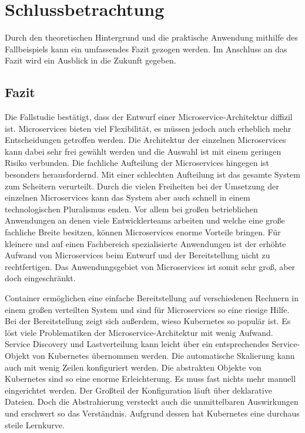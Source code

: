 \section{Schlussbetrachtung}

Durch den theoretischen Hintergrund und die praktische Anwendung mithilfe des Fallbeispiels kann ein umfassendes Fazit gezogen werden. Im Anschluss an das Fazit wird ein Ausblick in die Zukunft gegeben.

\subsection{Fazit}
Die Fallstudie bestätigt, dass der Entwurf einer Microservice-Architektur diffizil ist. Microservices bieten viel Flexibilität, es müssen jedoch auch erheblich mehr Entscheidungen getroffen werden. Die Architektur der einzelnen Microservices kann dabei sehr frei gewählt werden und die Auswahl ist mit einem geringen Risiko verbunden. Die fachliche Aufteilung der Microservices hingegen ist besonders herausfordernd. Mit einer schlechten Aufteilung ist das gesamte System zum Scheitern verurteilt. Durch die vielen Freiheiten bei der Umsetzung der einzelnen Microservices kann das System aber auch schnell in einem technologischen Pluralismus enden. Vor allem bei großen betrieblichen Anwendungen an denen viele Entwicklerteams arbeiten und welche eine große fachliche Breite besitzen, können Microservices enorme Vorteile bringen. Für kleinere und auf einen Fachbereich spezialisierte Anwendungen ist der erhöhte Aufwand von Microservices beim Entwurf und der Bereitstellung nicht zu rechtfertigen. Das Anwendungsgebiet von Microservices ist somit sehr groß, aber doch eingeschränkt.

Container ermöglichen eine einfache Bereitstellung auf verschiedenen Rechnern in einem großen verteilten System und sind für Microservices so eine riesige Hilfe. Bei der Bereitstellung zeigt sich außerdem, wieso Kubernetes so populär ist. Es löst viele Problematiken der Microservice-Architektur mit wenig Aufwand. Service Discovery und Lastverteilung kann leicht über ein entsprechendes Service-Objekt von Kubernetes übernommen werden. Die automatische Skalierung kann auch mit wenig Zeilen konfiguriert werden. Die abstrakten Objekte von Kubernetes sind so eine enorme Erleichterung. Es muss fast nichts mehr manuell eingerichtet werden. Der Großteil der Konfiguration läuft über deklarative Dateien. Doch die Abstrahierung versteckt auch die unmittelbaren Auswirkungen und erschwert so das Verständnis. Aufgrund dessen hat Kubernetes eine durchaus steile Lernkurve.

